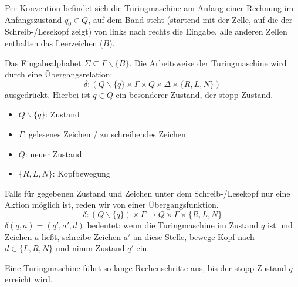 \par\medskip Per Konvention befindet sich die Turingmaschine am Anfang einer Rechnung im Anfangszustand $q_0 \in Q$, auf dem Band steht (startend mit der Zelle, auf die der Schreib-/Lesekopf zeigt) von links nach rechts die Eingabe, alle anderen Zellen enthalten das Leerzeichen ($B$).

\par\medskip Das Eingabealphabet $\Sigma \subseteq \Gamma \backslash \{B\}$. Die Arbeitsweise der Turingmaschine wird durch eine Übergangsrelation: $$ \delta : (Q \backslash \{ \overline{q}\} \times \Gamma \times Q \times \Delta \times \{ R,L,N \}) $$ ausgedrückt. Hierbei ist $\overline{q} \in Q$ ein besonderer Zustand, der stopp-Zustand.

\par\medskip
\begin{itemize}
	\item[] $Q \backslash \{ \overline{q}\}$: Zustand
	\item[] $\Gamma$: gelesenes Zeichen / zu schreibendes Zeichen
	\item[] $Q$: neuer Zustand
	\item[] $\{ R,L,N \}$: Kopfbewegung
\end{itemize}

\par\medskip Falls für gegebenen Zustand und Zeichen unter dem Schreib-/Lesekopf nur eine Aktion möglich ist, reden wir von einer Übergangsfunktion. $$ \delta : (Q \backslash \{ \overline{q}\}) \times \Gamma \rightarrow Q \times \Gamma \times \{R,L,N\} $$ $\delta(q,a)=(q',a',d)$ bedeutet: wenn die Turingmaschine im Zustand $q$ ist und Zeichen $a$ ließt, schreibe Zeichen $a'$ an diese Stelle, bewege Kopf nach $d \in \{L,R,N\}$ und nimm Zustand $q'$ ein.

\par\medskip Eine Turingmaschine führt so lange Rechenschritte aus, bis der stopp-Zustand $\overline{q}$ erreicht wird.

